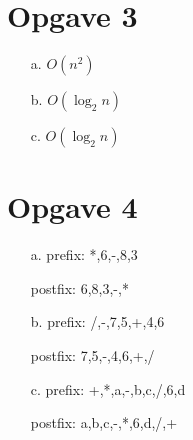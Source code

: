 \documentclass[12pt,a4paper]{article}
\begin{document}
\section{Opgave 3}
\begin{itemize}
\item[a.] $O(n^2)$
\item[b.] $O(\log_2 n)$
\item[c.] $O(\log_2 n)$
\end{itemize}

\section{Opgave 4}
\begin{itemize}
\item[a.] prefix: {*,6,-,8,3}
\item[] postfix: {6,8,3,-,*}
\item[b.] prefix: {/,-,7,5,+,4,6}
\item[] postfix: {7,5,-,4,6,+,/}
\item[c.] prefix: {+,*,a,-,b,c,/,6,d}
\item[] postfix: {a,b,c,-,*,6,d,/,+}
\end{itemize}
\end{document}
